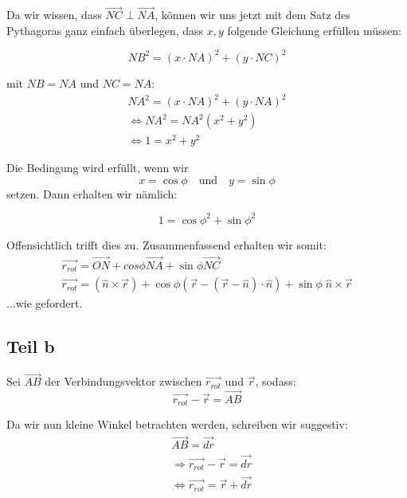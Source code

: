 \documentclass[a4paper,german,12pt,smallheadings]{scrartcl}
\begin{document}
Da wir wissen, dass $\vec{NC}\perp\vec{NA}$, können wir uns jetzt mit dem Satz des Pythagoras ganz einfach überlegen, dass $x,y$ folgende Gleichung erfüllen müssen:

\begin{equation*}
NB^2=(x\cdot NA)^2+(y\cdot NC)^2
\end{equation*}

mit $NB=NA$ und $NC=NA$:
\begin{align*}
NA^2=(x\cdot NA)^2 + (y\cdot NA)^2\\
\Leftrightarrow NA^2=NA^2\left(x^2+y^2\right)\\
\Leftrightarrow 1=x^2+y^2
\end{align*}

Die Bedingung wird erfüllt, wenn wir
\begin{equation*}
x=\cos\phi \quad \text{und} \quad y=\sin\phi 
\end{equation*}
setzen. Dann erhalten wir nämlich:

\begin{equation*}
1=\cos\phi^2+\sin\phi^2
\end{equation*}

Offensichtlich trifft dies zu. Zusammenfassend erhalten wir somit:
\begin{align*}
\vec{r_{rot}}=\vec{ON}+cos\phi\vec{NA}+\sin\phi\vec{NC}\\
\vec{r_{rot}}=\left(\hat{n} \times \vec{r}\right)+\cos\phi\left(\vec{r}-\left(\vec{r}-\hat{n}\right) \cdot \hat{n}\right)+\sin\phi \; \hat{n} \times \vec{r}
\end{align*}
...wie gefordert.

\subsection*{Teil b}

Sei $\vec{AB}$ der Verbindungsvektor zwischen $\vec{r_{rot}}$ und $\vec{r}$, sodass:
\begin{equation*}
\vec{r_{rot}}-\vec{r}=\vec{AB}
\end{equation*}

Da wir nun kleine Winkel betrachten werden, schreiben wir suggestiv:
\begin{align*}
& \vec{AB}=\vec{dr}\\
& \Rightarrow \vec{r_{rot}}-\vec{r}=\vec{dr}\\
& \Leftrightarrow \vec{r_{rot}}=\vec{r}+\vec{dr}
\end{align*}
\end{document}

